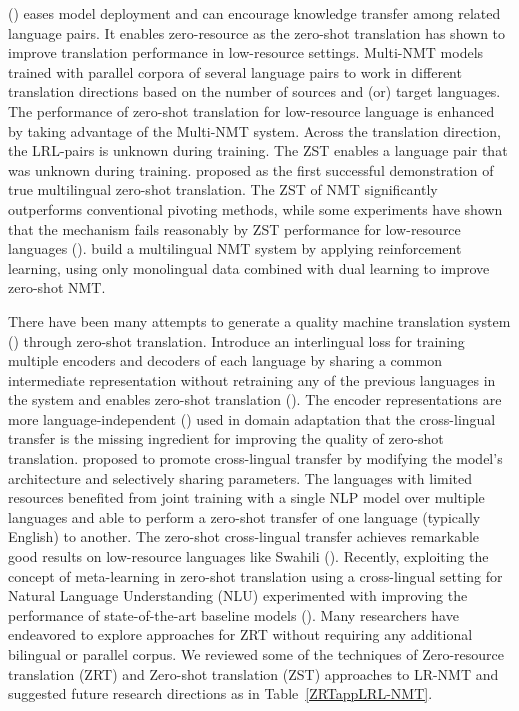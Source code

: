 \documentclass[manuscript,screen]{acmart}
\begin{document}
(\citet{ha2toward,arivazhagan2019massively}) eases model deployment and can encourage knowledge transfer among related language pairs. It enables zero-resource as the zero-shot translation has shown to improve translation performance in low-resource settings. Multi-NMT models trained with parallel corpora of several language pairs to work in different translation directions based on the number of sources and (or) target languages. The performance of zero-shot translation for low-resource language is enhanced by taking advantage of the Multi-NMT system. Across the translation direction, the LRL-pairs is unknown during training. The ZST enables a language pair that was unknown during training. \citet{johnson-etal-2017-googles} proposed as the first successful demonstration of true multilingual zero-shot translation. The ZST of NMT significantly outperforms conventional pivoting methods, while some experiments have shown that the mechanism fails reasonably by ZST performance for low-resource languages (\citet{lakew2017multilingual}). \citet{sestorain2018zero} build a multilingual NMT system by applying reinforcement learning, using only monolingual data combined with dual learning to improve zero-shot NMT. 
 
There have been many attempts to generate a quality machine translation system (\citet{ha2017effective, lakew2018improving, gu2019improved, al2019consistency, hokamp2019evaluating,mattoni2017zero,pham2019improving}) through zero-shot translation. Introduce an interlingual loss for training multiple encoders and decoders of each language by sharing a common intermediate representation without retraining any of the previous languages in the system and enables zero-shot translation (\citet{escolano2020bilingual}).
The encoder representations are more language-independent (\citet{arivazhagan2019missing}) used in domain adaptation that the cross-lingual transfer is the missing ingredient for improving the quality of zero-shot translation. \citet{firat2016zero} proposed to promote cross-lingual transfer by modifying the model's architecture and selectively sharing parameters.
The languages with limited resources benefited from joint training with a single NLP model over multiple languages and able to perform a zero-shot transfer of one language (typically English) to another. The zero-shot cross-lingual transfer achieves remarkable good results on low-resource languages like Swahili (\citet{artetxe2019massively}). Recently, exploiting the concept of meta-learning in zero-shot translation using a cross-lingual setting for Natural Language Understanding (NLU) experimented with improving the performance of state-of-the-art baseline models (\citet{nooralahzadeh2020zero}). Many researchers have endeavored to explore approaches for ZRT without requiring any additional bilingual or parallel corpus.
We reviewed some of the techniques of Zero-resource translation (ZRT) and Zero-shot translation (ZST) approaches to LR-NMT and suggested future research directions as in Table~\ref{ZRTappLRL-NMT}.
\end{document}
